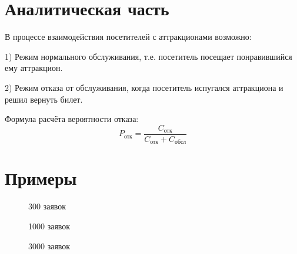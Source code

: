 \documentclass[14pt, a4paper]{extarticle}
\begin{document}
	\clearpage
	\section*{Аналитическая часть}
	В процессе взаимодействия посетителей с аттракционами возможно:
	
	1) Режим нормального обслуживания, т.е. посетитель посещает понравившийся ему аттракцион.
	
	2) Режим отказа от обслуживания, когда посетитель испугался аттракциона и решил вернуть билет.\par
	
	Формула расчёта вероятности отказа:
	\begin{equation*}
		P_{\text{отк}} = \frac{C_{\text{отк}}}{C_{\text{отк}} + C_{\text{обсл}}}
	\end{equation*}
	
	\clearpage
	\section*{Примеры}
	
	\begin{figure}[h!]
		\centering\caption{300 заявок}
	\end{figure}


	\begin{figure}[h!]
		\centering\caption{1000 заявок}
	\end{figure}
	
	\begin{figure}[h!]
		\centering\caption{3000 заявок}
	\end{figure}
	
\end{document}
